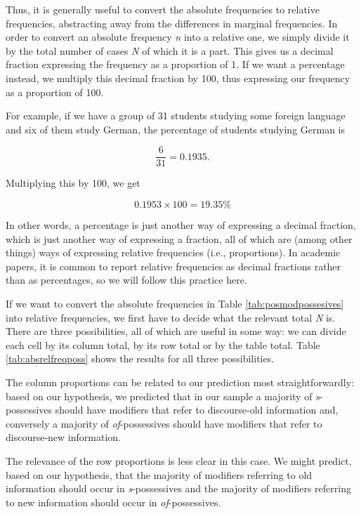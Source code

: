 Thus, it is generally useful to convert the absolute frequencies to relative frequencies, abstracting away from the differences in marginal frequencies. In order to convert an absolute frequency \textit{n} into a relative one, we simply divide it by the total number of cases \textit{N} of which it is a part. This gives us a decimal fraction expressing the frequency as a proportion of 1. If we want a percentage instead, we multiply this decimal fraction by 100, thus expressing our frequency as a proportion of 100.

For example, if we have a group of 31 students studying some foreign language and six of them study German, the percentage of students studying German is

$$\frac{6}{31} = 0.1935.$$

Multiplying this by 100, we get

$$0.1953 \times 100 = 19.35\%$$

In other words, a percentage is just another way of expressing a decimal fraction, which is just another way of expressing a fraction, all of which are (among other things) ways of expressing relative frequencies (i.e., proportions). In academic papers, it is common to report relative frequencies as decimal fractions rather than as percentages, so we will follow this practice here.

If we want to convert the absolute frequencies in Table \ref{tab:posmodpossesives} into relative frequencies, we first have to decide what the relevant total \emph{N} is. There are three possibilities, all of which are useful in some way: we can divide each cell by its column total, by its row total or by the table total. Table \ref{tab:absrelfreqposs} shows the results for all three possibilities.

The column proportions can be related to our prediction most straightforwardly: based on our hypothesis, we predicted that in our sample a majority of \textit{s}-possessives should have modifiers that refer to discourse-old information and, conversely a majority of \textit{of}-possessives should have modifiers that refer to discourse-new information.

The relevance of the row proportions is less clear in this case. We might predict, based on our hypothesis, that the majority of modifiers referring to old information should occur in \textit{s}-possessives and the majority of modifiers referring to new information should occur in \textit{of}-possessives.

